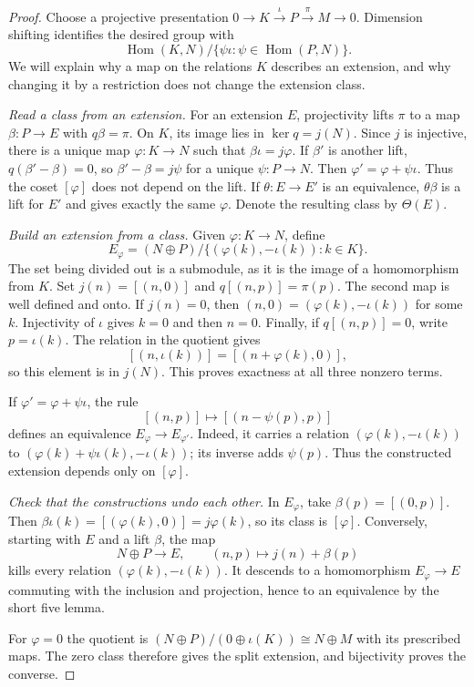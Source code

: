 \begin{proof}
Choose a projective presentation
$0\to K\xrightarrow{\iota}P\xrightarrow{\pi}M\to0$.
Dimension shifting identifies the desired group with
\[
\operatorname{Hom}(K,N)/\{\psi\iota:\psi\in\operatorname{Hom}(P,N)\}.
\]
We will explain why a map on the relations $K$ describes an extension, and why changing it by a restriction does not change the extension class.

\emph{Read a class from an extension.} For an extension $E$, projectivity lifts $\pi$ to a map $\beta:P\to E$ with $q\beta=\pi$. On $K$, its image lies in $\ker q=j(N)$. Since $j$ is injective, there is a unique map $\varphi:K\to N$ such that
$\beta\iota=j\varphi$.
If $\beta'$ is another lift, $q(\beta'-\beta)=0$, so $\beta'-\beta=j\psi$ for a unique $\psi:P\to N$. Then
$\varphi'=\varphi+\psi\iota$. Thus the coset $[\varphi]$ does not depend on the lift. If $\theta:E\to E'$ is an equivalence, $\theta\beta$ is a lift for $E'$ and gives exactly the same $\varphi$. Denote the resulting class by $\Theta(E)$.

\emph{Build an extension from a class.} Given $\varphi:K\to N$, define
\[
E_\varphi=(N\oplus P)/\{(\varphi(k),-\iota(k)):k\in K\}.
\]
The set being divided out is a submodule, as it is the image of a homomorphism from $K$. Set $j(n)=[(n,0)]$ and
$q[(n,p)]=\pi(p)$. The second map is well defined and onto. If $j(n)=0$, then
$(n,0)=(\varphi(k),-\iota(k))$ for some $k$. Injectivity of $\iota$ gives $k=0$ and then $n=0$. Finally, if $q[(n,p)]=0$, write $p=\iota(k)$. The relation in the quotient gives
\[
[(n,\iota(k))]=[(n+\varphi(k),0)],
\]
so this element is in $j(N)$. This proves exactness at all three nonzero terms.

If $\varphi'=\varphi+\psi\iota$, the rule
\[
[(n,p)]\longmapsto[(n-\psi(p),p)]
\]
defines an equivalence $E_\varphi\to E_{\varphi'}$. Indeed, it carries a relation
$(\varphi(k),-\iota(k))$ to
$(\varphi(k)+\psi\iota(k),-\iota(k))$; its inverse adds $\psi(p)$. Thus the constructed extension depends only on $[\varphi]$.

\emph{Check that the constructions undo each other.} In $E_\varphi$, take $\beta(p)=[(0,p)]$. Then
$\beta\iota(k)=[(\varphi(k),0)]=j\varphi(k)$, so its class is $[\varphi]$. Conversely, starting with $E$ and a lift $\beta$, the map
\[
N\oplus P\longrightarrow E,\qquad(n,p)\longmapsto j(n)+\beta(p)
\]
kills every relation $(\varphi(k),-\iota(k))$. It descends to a homomorphism $E_\varphi\to E$ commuting with the inclusion and projection, hence to an equivalence by the short five lemma.

For $\varphi=0$ the quotient is
$(N\oplus P)/(0\oplus\iota(K))\cong N\oplus M$ with its prescribed maps. The zero class therefore gives the split extension, and bijectivity proves the converse.
\end{proof}

